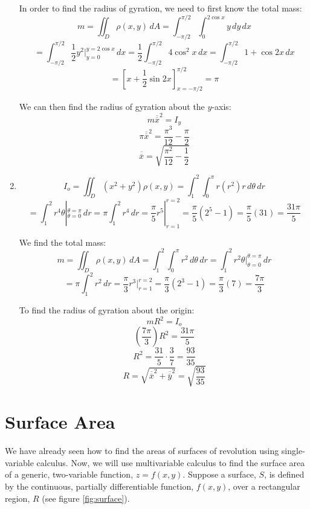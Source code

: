 \begin{Answer}[ref = moment]
\begin{enumerate}
In order to find the radius of gyration, we need to first know the total mass:
$$m = \iint_{\textit{D}} \rho(x, y)\,dA = \int_{-\pi/2}^{\pi/2} \int_{0}^{2
\cos{x}} y \,dy\,dx$$
$$= \int_{-\pi/2}^{\pi/2} \frac{1}{2}y^2|_{y = 0}^{y = 2\cos{x}}\,dx = 
\frac{1}{2} \int_{-\pi/2}^{\pi/2} 4\cos^2{x}\,dx = \int_{-\pi/2}^{\pi/2} 1 + 
\cos{2x}\,dx$$
$$= \left[x + \frac{1}{2}\sin{2x} \right]_{x = -\pi/2}^{\pi/2} = \pi$$

We can then find the radius of gyration about the $y$-axis:
$$m \overline{\overline{x}}^2 = I_y$$
$$\pi \overline{\overline{x}}^2 = \frac{\pi^3}{12} - \frac{\pi}{2}$$
$$\overline{\overline{x}} = \sqrt{\frac{\pi^2}{12} - \frac{1}{2}}$$

\item $$I_o = \iint_{\textit{D}} \left( x^2 + y^2 \right) \rho(x, y) = \int_1^2
\int_0^{\pi} r (r^2) r \,d\theta \,dr$$
$$= \int_1^2 r^4 \theta|_{\theta = 0}^{\theta = \pi}\,dr = \pi \int_1^2 r^4\,dr
= \frac{\pi}{5} r^5|_{r = 1}^{r = 2} = \frac{\pi}{5} \left(2^5 - 1 \right) = 
\frac{\pi}{5} (31) = \frac{31\pi}{5}$$

We find the total mass:
$$m = \iint_{\textit{D}} \rho(x,y)\,dA = \int_1^2 \int_0^{\pi} r^2\,d\theta\,dr
= \int_1^2 r^2 \theta|_{\theta = 0}^{\theta = \pi}\,dr$$
$$= \pi \int_1^2 r^2\,dr = \frac{\pi}{3} r^3|_{r = 1}^{r = 2} = \frac{\pi}{3} 
\left(2^3 - 1 \right) = \frac{\pi}{3}(7) = \frac{7\pi}{3}$$

To find the radius of gyration about the origin:
$$mR^2 = I_o$$
$$\left( \frac{7\pi}{3} \right) R^2 = \frac{31\pi}{5}$$
$$R^2 = \frac{31}{5} \cdot \frac{3}{7} = \frac{93}{35}$$
$$R = \sqrt{\overline{\overline{x}}^2 + \overline{\overline{y}}^2} = \sqrt{
\frac{93}{35}}$$
\end{enumerate}
\end{Answer}

\section{Surface Area}
We have already seen how to find the areas of surfaces of revolution using 
single-variable calculus. Now, we will use multivariable calculus to find the 
surface area of a generic, two-variable function, $z = f(x, y)$. Suppose a 
surface, $S$, is defined by the continuous, partially differentiable function, 
$f(x, y)$, over a rectangular region, $R$ (see figure \ref{fig:surface}). 


